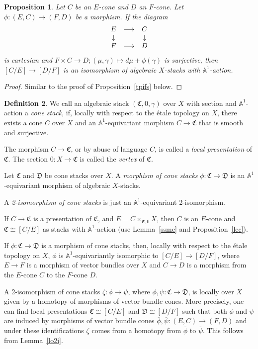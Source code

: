\documentclass[11pt]{article}
\theoremstyle{plain}
\newtheorem{prop}{Proposition}[section]
\theoremstyle{definition}
\newtheorem{defnp}[prop]{Definition}
\newenvironment{defn}{\begin{defnp}\normalfont}{\end{defnp}}
\newenvironment{pf}{\begin{proof}}{\end{proof}}
\newcommand{\DD}{{\mathfrak{D}}}
\newcommand{\CC}{{\mathfrak{C}}}
\newcommand{\aaa}{{\mathbb{A}}}
\newcommand{\ol}{\overline}
\newcommand{\ldiag}[1]
       {\makebox[0cm]{\({\scriptstyle#1}\downarrow\phantom{\scriptstyle#1}\)}}
\newcommand{\rdiag}[1]
       {\makebox[0cm]{\(\phantom{\scriptstyle#1}\downarrow{\scriptstyle#1}\)}}
\newcommand{\comdia}[9]{
\begin{array}{ccc}
#1 & \stackrel{#2}{\longrightarrow} & #3 \\
\ldiag{#4} & #5 & \rdiag{#6} \\
#7 & \stackrel{#8}{\longrightarrow} & #9
\end{array}}
\theoremstyle{plain}
\theoremstyle{definition}
\theoremstyle{remark}
\begin{document}
\begin{prop} \label{cics}
Let \(C\) be an \(E\)-cone and \(D\) an \(F\)-cone. Let
\(\phi:(E,C)\rightarrow(F,D)\) be a morphism. If the diagram
\[
\comdia{E}{}{C}{}{}{}{F}{}{D}
\]
is cartesian and \(F\times C\rightarrow
D;(\mu,\gamma)\mapsto d\mu+\phi(\gamma)\) is surjective, then
\([C/E]\rightarrow[D/F]\) is an isomorphism of algebraic \(X\)-stacks with
\(\aaa^1\)-action.
\end{prop}
\begin{pf}
Similar to the proof of Proposition~\ref{tpifs} below.
\end{pf}

\begin{defn} \label{docs}
We call an algebraic stack \((\CC,0,\gamma)\) over \(X\) with section and
\(\aaa^1\)-action a {\em cone stack}, if, locally with respect to the
\'etale topology on \(X\), there exists a cone \(C\) over \(X\) and an
\(\aaa^1\)-equivariant morphism \(C\to\CC\) that is smooth and surjective.

The morphism \(C\rightarrow\CC\), or by abuse of language \(C\), is called
a {\em local presentation }of \(\CC\). The section \(0:X\to\CC\) is called
the {\em vertex }of \(\CC\).

Let \(\CC\) and \(\DD\) be cone stacks over \(X\). A {\em morphism of cone
stacks } \(\phi:\CC\rightarrow\DD\) is an \(\aaa^1\)-equivariant morphism
of algebraic \(X\)-stacks.

A {\em 2-isomorphism of cone stacks } is just an \(\aaa^1\)-equivariant
2-isomorphism.
\end{defn}

If \(C\rightarrow\CC\) is a presentation of \(\CC\), and
\(E=C\times_{\CC,0}X\), then \(C\) is an \(E\)-cone and \(\CC\cong[C/E]\)
as stacks with \(\aaa^1\)-action (use Lemma~\ref{ssmc} and
Proposition~\ref{lcc}).

If \(\phi:\CC\to\DD\) is a morphism of cone stacks, then, locally with
respect to the \'etale topology on \(X\), \(\phi\) is
\(\aaa^1\)-equivariantly isomorphic to \([C/E]\to [D/F]\), where \(E\to F\)
is a morphism of vector bundles over \(X\) and \(C\to D\) is a
morphism from the \(E\)-cone \(C\) to the \(F\)-cone \(D\).

A 2-isomorphism of cone stacks \(\zeta:\phi\to\psi\), where
\(\phi,\psi:\CC\to\DD\), is locally over \(X\) given by a homotopy of
morphisms of vector bundle cones. More precisely, one can find local
presentations \(\CC\cong[C/E]\) and \(\DD\cong[D/F]\) such that both
\(\phi\) and \(\psi\) are induced by morphisms of vector bundle cones
\(\ol{\phi},\ol{\psi}:(E,C)\to(F,D)\) and under these identifications
\(\zeta\) comes from a homotopy from \(\ol{\phi}\) to \(\ol{\psi}\). This
follows from Lemma~\ref{lo2i}.
\end{document}
